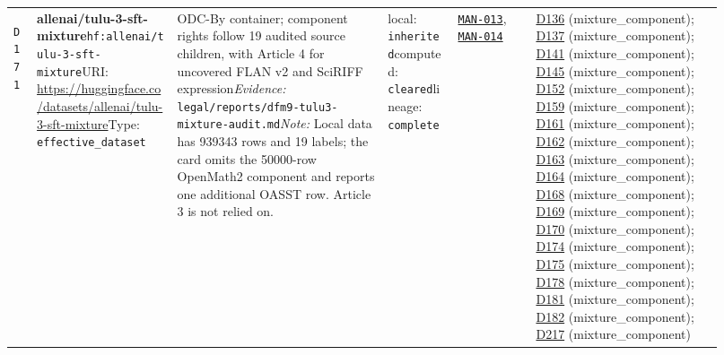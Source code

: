 \documentclass[9pt,a4paper]{article}
\newcommand{\depid}[1]{\hypertarget{dep:#1}{\texttt{#1}}}
\begin{document}
\begin{landscape}
\begin{longtable}{@{}L{0.035\linewidth}L{0.185\linewidth}L{0.27\linewidth}L{0.09\linewidth}L{0.10\linewidth}L{0.24\linewidth}@{}}
\depid{D171} & \textbf{allenai/tulu-3-sft-mixture}\newline \nolinkurl{hf:allenai/tulu-3-sft-mixture}\newline URI: \url{https://huggingface.co/datasets/allenai/tulu-3-sft-mixture}\newline Type: \texttt{effective\_dataset} & ODC-By container; component rights follow 19 audited source children, with Article 4 for uncovered FLAN v2 and SciRIFF expression\newline \textit{Evidence:} \nolinkurl{legal/reports/dfm9-tulu3-mixture-audit.md}\newline \textit{Note:} Local data has 939343 rows and 19 labels; the card omits the 50000-row OpenMath2 component and reports one additional OASST row. Article 3 is not relied on. & local: \texttt{inherited}\newline computed: \texttt{cleared}\newline lineage: \texttt{complete} & \hyperlink{manual:MAN-013}{\texttt{MAN-013}}, \hyperlink{manual:MAN-014}{\texttt{MAN-014}} & \hyperlink{dep:D136}{D136} (mixture\_component); \hyperlink{dep:D137}{D137} (mixture\_component); \hyperlink{dep:D141}{D141} (mixture\_component); \hyperlink{dep:D145}{D145} (mixture\_component); \hyperlink{dep:D152}{D152} (mixture\_component); \hyperlink{dep:D159}{D159} (mixture\_component); \hyperlink{dep:D161}{D161} (mixture\_component); \hyperlink{dep:D162}{D162} (mixture\_component); \hyperlink{dep:D163}{D163} (mixture\_component); \hyperlink{dep:D164}{D164} (mixture\_component); \hyperlink{dep:D168}{D168} (mixture\_component); \hyperlink{dep:D169}{D169} (mixture\_component); \hyperlink{dep:D170}{D170} (mixture\_component); \hyperlink{dep:D174}{D174} (mixture\_component); \hyperlink{dep:D175}{D175} (mixture\_component); \hyperlink{dep:D178}{D178} (mixture\_component); \hyperlink{dep:D181}{D181} (mixture\_component); \hyperlink{dep:D182}{D182} (mixture\_component); \hyperlink{dep:D217}{D217} (mixture\_component) \\

\end{longtable}
\end{landscape}
\end{document}
